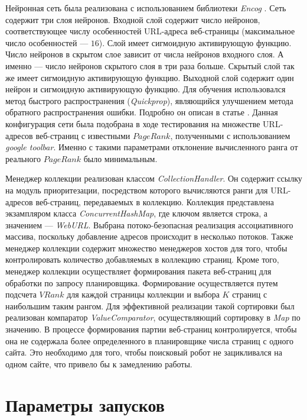 Нейронная сеть была реализована с использованием библиотеки \textit{Encog} \cite{encog}. Сеть содержит три слоя нейронов. Входной слой содержит число нейронов, соответствующее числу особенностей URL-адреса веб-страницы (максимальное число особенностей --- $16$). Слой имеет сигмоидную активирующую функцию. Число нейронов в скрытом слое зависит от числа нейронов входного слоя. А именно --- число нейронов скрытого слоя в три раза больше. Скрытый слой так же имеет сигмоидную активирующую функцию. Выходной слой содержит один нейрон и сигмоидную активирующую функцию. Для обучения использовался метод быстрого распространения (\textit{Quickprop}), являющийся улучшением метода обратного распространения ошибки. Подробно он описан в статье \cite{Fahlman88anempirical}. Данная конфигурация сети была подобрана в ходе тестирования на множестве URL-адресов веб-страниц с известными $PageRank$, полученными с использованием \textit{google toolbar}. Именно с такими параметрами отклонение вычисленного ранга от реального $PageRank$ было минимальным.

Менеджер коллекции реализован классом \textit{CollectionHandler}. Он содержит ссылку на модуль приоритезации, посредством которого вычисляются ранги для URL-адресов веб-страниц, передаваемых в коллекцию. Коллекция представлена экзампляром класса \textit{ConcurrentHashMap}, где ключом является строка, а значением --- \textit{WebURL}. Выбрана потоко-безопасная реализация ассоциативного массива, поскольку добавление адресов происходит в несколько потоков. Также менеджер коллекции содержит множество менеджеров хостов для того, чтобы контролировать количество добавляемых в коллекцию страниц. Кроме того, менеджер коллекции осуществляет формирования пакета веб-страниц для обработки по запросу планировщика. Формирование осуществляется путем подсчета $VRank$ для каждой страницы коллекции и выбора $K$ страниц с наибольшим таким рангом. Для эффективной реализации такой сортировки был реализован компаратор \textit{ValueComparator}, осуществляющий сортировку в \textit{Map} по значению. В процессе формирования партии веб-страниц контролируется, чтобы она не содержала более определенного в планировщике числа страниц с одного сайта. Это необходимо для того, чтобы поисковый робот не зацикливался на одном сайте, что привело бы к замедлению работы.

\section{Параметры запусков}

